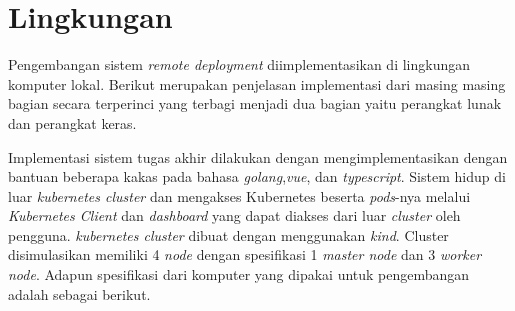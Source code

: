 \section{Lingkungan}
\label{sec:lingkungan-implementasi}
Pengembangan sistem \textit{remote deployment} diimplementasikan di lingkungan komputer lokal. Berikut merupakan penjelasan implementasi dari masing masing bagian secara terperinci yang terbagi menjadi dua bagian yaitu perangkat lunak dan perangkat keras.

Implementasi sistem tugas akhir dilakukan dengan mengimplementasikan dengan bantuan beberapa kakas pada bahasa \textit{golang},\textit{vue}, dan \textit{typescript}. Sistem hidup di luar \textit{kubernetes cluster} dan mengakses Kubernetes beserta \textit{pods}-nya melalui \textit{Kubernetes Client} dan \textit{dashboard} yang dapat diakses dari luar \textit{cluster} oleh pengguna. \textit{kubernetes cluster} dibuat dengan menggunakan \textit{kind}. Cluster disimulasikan memiliki 4 \textit{node} dengan spesifikasi 1 \textit{master node} dan 3 \textit{worker node}. Adapun spesifikasi dari komputer yang dipakai untuk pengembangan adalah sebagai berikut.
